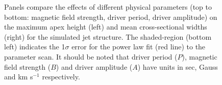 \begin{figure}
\captionsetup[subfigure]{labelformat=empty}
\centering
{}
\caption{Panels compare the effects of different physical parameters (top to bottom: magnetic field strength, driver period, driver amplitude) on the maximum apex height (left) and mean cross-sectional widths (right) for the simulated jet structure. The shaded-region (bottom left) indicates the 1$\sigma$ error for the power law fit (red line) to the parameter scan. It should be noted that driver period ($P$), magnetic field strength ($B$) and driver amplitude ($A$) have units in sec, Gauss and km s$^{-1}$ respectively.}
\label{parameter_scan_lines}
\end{figure}
